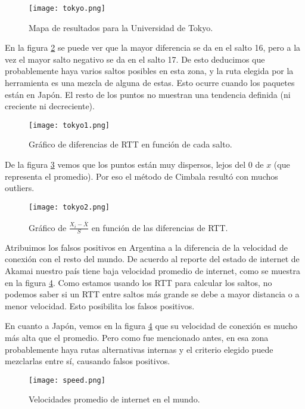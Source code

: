 \begin{figure}[H]
\texttt{[image: tokyo.png]}
\caption{Mapa de resultados para la Universidad de Tokyo.}
\label{mapa1}
\end{figure}

En la figura \ref{diff1} se puede ver que la mayor diferencia se da en el salto 16, pero a la vez el mayor salto negativo se da en el salto 17. De esto deducimos que probablemente haya varios saltos posibles en esta zona, y la ruta elegida por la herramienta es una mezcla de alguna de estas. Esto ocurre cuando los paquetes están en Japón. El resto de los puntos no muestran una tendencia definida (ni creciente ni decreciente).

\begin{figure}[H]
\centering
\texttt{[image: tokyo1.png]}
\caption{Gráfico de diferencias de RTT en función de cada salto.}
\label{diff1}
\end{figure}

De la figura \ref{sdev1} vemos que los puntos están muy dispersos, lejos del 0 de $x$ (que representa el promedio). Por eso el método de Cimbala resultó con muchos outliers.

\begin{figure}[H]
\centering
\texttt{[image: tokyo2.png]}
\caption{Gráfico de $\frac{X_i - \bar{X}}{S}$ en función de las diferencias de RTT.}
\label{sdev1}
\end{figure}

Atribuimos los falsos positivos en Argentina a la diferencia de la velocidad de conexión con el resto del mundo. De acuerdo al reporte del estado de internet de Akamai \cite{akamai} nuestro país tiene baja velocidad promedio de internet, como se muestra en la figura \ref{speed}. Como estamos usando los RTT para calcular los saltos, no podemos saber si un RTT entre saltos más grande se debe a mayor distancia o a menor velocidad. Esto posibilita los falsos positivos.

En cuanto a Japón, vemos en la figura \ref{speed} que su velocidad de conexión es mucho más alta que el promedio. Pero como fue mencionado antes, en esa zona probablemente haya rutas alternativas internas y el criterio elegido puede mezclarlas entre sí, causando falsos positivos.

\begin{figure}[H]
\centering
\texttt{[image: speed.png]}
\caption{Velocidades promedio de internet en el mundo.}
\label{speed}
\end{figure}
